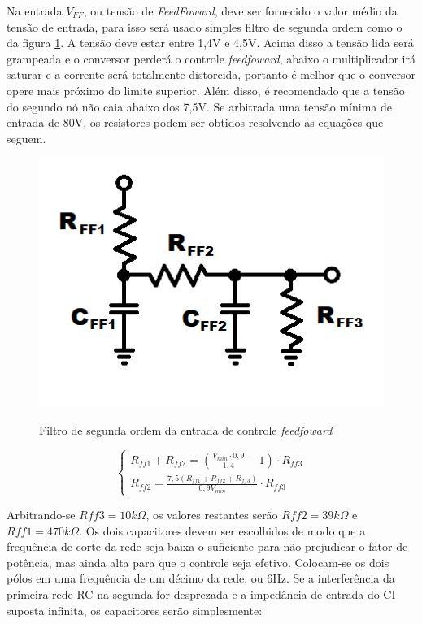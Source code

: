 \documentclass[
        12pt,
        openany, %
        oneside, %
        a4paper,			
        english,			
        brazil
        ]{abntbibufjf}
\begin{document}
Na entrada $V_{FF}$, ou tensão de \textit{FeedFoward}, deve ser fornecido o valor médio da tensão de entrada, para isso será usado simples filtro de segunda ordem como o da figura \ref{vff}. A tensão deve estar entre 1,4V e 4,5V. Acima disso a tensão lida será grampeada e o conversor perderá o controle \textit{feedfoward}, abaixo o multiplicador irá saturar e a corrente será totalmente distorcida, portanto é melhor que o conversor opere mais próximo do limite superior. Além disso, é recomendado que a tensão do segundo nó não caia abaixo dos 7,5V. Se arbitrada uma tensão mínima de entrada de 80V, os resistores podem ser obtidos resolvendo as equações que seguem.

\begin{figure}[!h]
	\centering
	\caption{Filtro de segunda ordem da entrada de controle \textit{feedfoward}}
	\includegraphics[scale=.7]{../ESQUEMAS/vff.png}\\
	\label{vff}
\end{figure}

\begin{equation}
\begin{cases}
R_{ff1}+R_{ff2} =\left( \frac{V_{min}\cdot 0,9}{1,4} -1 \right) \cdot R_{ff3}\\
R_{ff2} =\frac{7,5 \left( R_{ff1}+R_{ff2}+R_{ff3}\right)}{0,9V_{min}} \cdot R_{ff3}
\end{cases}
\end{equation}

Arbitrando-se $Rff3=10k\Omega$, os valores restantes serão $Rff2=39k\Omega$ e $Rff1=470k\Omega$. Os dois capacitores devem ser escolhidos de modo que a frequência de corte da rede seja baixa o suficiente para não prejudicar o fator de potência, mas ainda alta para que o controle seja efetivo. Colocam-se os dois pólos em uma frequência de um décimo da rede, ou 6Hz. Se a interferência da primeira rede RC na segunda for desprezada e a impedância de entrada do CI suposta infinita, os capacitores serão simplesmente:
\end{document}
